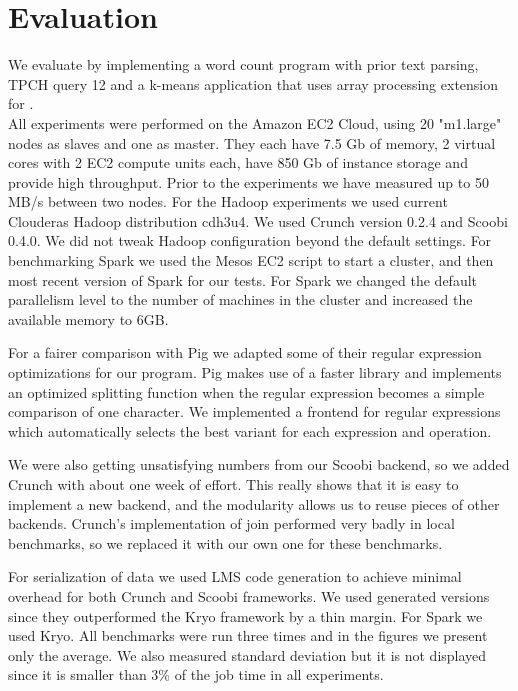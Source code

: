 \section{Evaluation}
\label{sec:evaluation}

We evaluate \tool by implementing a word count program with prior text parsing, TPCH query 12 and a k-means application that uses array processing extension for \tool. \\

All experiments were performed on the Amazon EC2 Cloud, using 20 "m1.large" nodes as slaves and one as master. They each have 7.5 Gb of memory, 2 virtual cores with 2 EC2 compute units each, have 850 Gb of instance storage and provide high throughput. Prior to the experiments we have measured up to 50 MB/s between two nodes. For the Hadoop experiments we used current Clouderas Hadoop distribution cdh3u4. We used Crunch version 0.2.4 and Scoobi 0.4.0. We did not tweak Hadoop configuration beyond the default settings. For benchmarking Spark we used the Mesos \cite{hindman_mesos:_2011} EC2 script to start a cluster, and then most recent version of Spark for our tests.  For Spark we changed the default parallelism level to the number of machines in the cluster and increased the available memory to 6GB. 

For a fairer comparison with Pig we adapted some of their regular expression optimizations for our program. Pig makes use of a faster library  and implements an optimized splitting function when the regular expression becomes a simple comparison of one character. We implemented a frontend for regular expressions which automatically selects the best variant for each expression and operation. 

We were also getting unsatisfying numbers from our Scoobi backend, so we added Crunch with about one week of effort. This really shows that it is easy to implement a new backend, and the modularity allows us to reuse pieces of other backends. Crunch's implementation of join performed very badly in local benchmarks, so we replaced it with our own one for these benchmarks.

For serialization of data we used LMS code generation to achieve minimal overhead for both Crunch and Scoobi frameworks. We used generated versions since they outperformed the Kryo framework by a thin margin. For Spark we used Kryo. All benchmarks were run three times and in the figures we present only the average. We also measured standard deviation but it is not displayed since it is smaller than 3\% of the job time in all experiments.

